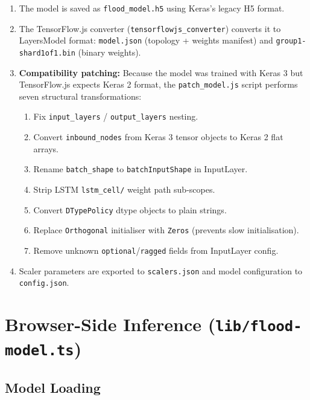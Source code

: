 \begin{enumerate}[leftmargin=1.5em]
  \item The model is saved as \texttt{flood\_\allowbreak{}model.\allowbreak{}h5} using Keras's legacy H5 format.
  \item The TensorFlow.js converter (\texttt{tensorflowjs\_\allowbreak{}converter}) converts it to LayersModel format: \texttt{model.\allowbreak{}json} (topology + weights manifest) and \texttt{group1-shard1of1.\allowbreak{}bin} (binary weights).
  \item \textbf{Compatibility patching:} Because the model was trained with Keras 3 but TensorFlow.js expects Keras 2 format, the \texttt{patch\_\allowbreak{}model.\allowbreak{}js} script performs seven structural transformations:
    \begin{enumerate}
      \item Fix \texttt{input\_\allowbreak{}layers} / \texttt{output\_\allowbreak{}layers} nesting.
      \item Convert \texttt{inbound\_\allowbreak{}nodes} from Keras 3 tensor objects to Keras 2 flat arrays.
      \item Rename \texttt{batch\_\allowbreak{}shape} to \texttt{batchInputShape} in InputLayer.
      \item Strip LSTM \texttt{lstm\_\allowbreak{}cell/\allowbreak{}} weight path sub-scopes.
      \item Convert \texttt{DTypePolicy} dtype objects to plain strings.
      \item Replace \texttt{Orthogonal} initialiser with \texttt{Zeros} (prevents slow initialisation).
      \item Remove unknown \texttt{optional}/\texttt{ragged} fields from InputLayer config.
    \end{enumerate}
  \item Scaler parameters are exported to \texttt{scalers.\allowbreak{}json} and model configuration to \texttt{config.\allowbreak{}json}.
\end{enumerate}

\section{Browser-Side Inference (\texttt{lib/\allowbreak{}flood-model.\allowbreak{}ts})}

\subsection{Model Loading}

